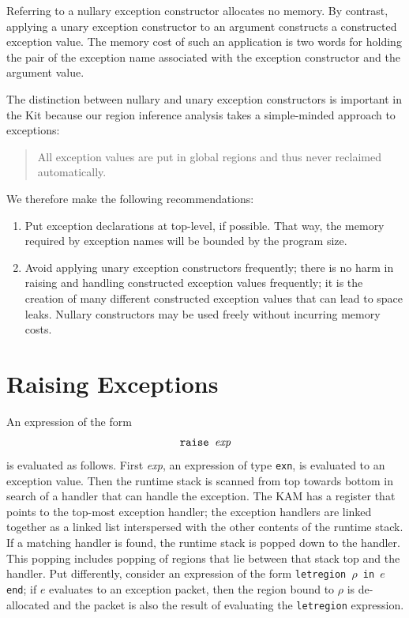 \documentclass[12pt]{book}
\begin{document}
Referring to a nullary exception constructor allocates no memory. By
contrast, applying a unary exception constructor to an argument
constructs a constructed exception value. The memory cost of such an
application is two words for holding the pair of the exception name
associated with the exception constructor and the argument value.

The distinction between nullary and unary exception constructors
is important in the Kit because our region inference analysis
takes a simple-minded approach to exceptions: 
\begin{quote}
  All exception values are put in
  global regions and thus never reclaimed automatically.
\end{quote}
We therefore make the following recommendations:
\begin{enumerate}
\item Put exception declarations at top-level, if possible.
      That way, the memory required by exception names will
       be bounded by the program size.
\item Avoid applying unary exception constructors frequently; there is
      no harm in raising and handling constructed exception values frequently;
      it is the creation of many different constructed exception values
      that can lead to space leaks. Nullary
      constructors may be used freely without incurring memory costs.
\end{enumerate}

\section{Raising Exceptions}
An expression of the form 
$$\hbox{\tt raise {\it exp}}$$
is evaluated as follows. First {\it exp}, an expression of 
type {\tt exn}, is evaluated to an exception value. Then the runtime
stack is scanned from top towards bottom in search of a handler
that can handle the exception. The KAM has a register that points
to the top-most exception handler; the exception handlers are linked
together as a linked list interspersed with the other contents of
the runtime stack. If a matching handler is found, the runtime stack
is popped down to the handler. This popping includes popping of regions
that lie between that stack top and the handler. Put differently,
consider an expression of the form 
{\tt letregion $\rho$ in $e$ end}; if $e$ evaluates to an exception packet,
then the region bound to $\rho$ is de-allocated and the packet is also
the result of evaluating the \texttt{letregion} expression.
\end{document}
